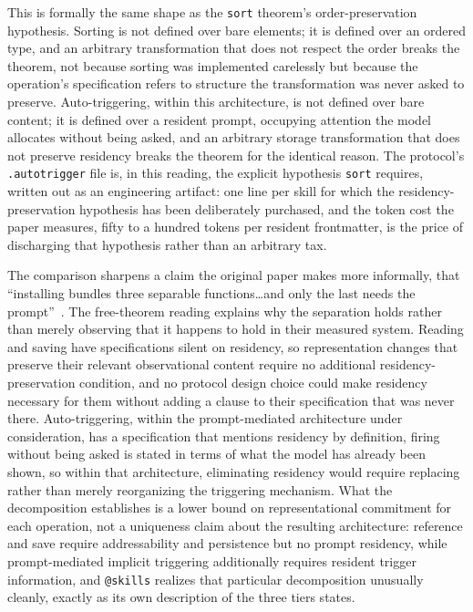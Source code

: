 \documentclass[11pt]{article}
\begin{document}
This is formally the same shape as the \texttt{sort} theorem's order-preservation hypothesis. Sorting is not defined over bare elements; it is defined over an ordered type, and an arbitrary transformation that does not respect the order breaks the theorem, not because sorting was implemented carelessly but because the operation's specification refers to structure the transformation was never asked to preserve. Auto-triggering, within this architecture, is not defined over bare content; it is defined over a resident prompt, occupying attention the model allocates without being asked, and an arbitrary storage transformation that does not preserve residency breaks the theorem for the identical reason. The protocol's \texttt{.autotrigger} file is, in this reading, the explicit hypothesis \texttt{sort} requires, written out as an engineering artifact: one line per skill for which the residency-preservation hypothesis has been deliberately purchased, and the token cost the paper measures, fifty to a hundred tokens per resident frontmatter, is the price of discharging that hypothesis rather than an arbitrary tax.

The comparison sharpens a claim the original paper makes more informally, that ``installing bundles three separable functions\ldots and only the last needs the prompt''~\cite{skills2026}. The free-theorem reading explains why the separation holds rather than merely observing that it happens to hold in their measured system. Reading and saving have specifications silent on residency, so representation changes that preserve their relevant observational content require no additional residency-preservation condition, and no protocol design choice could make residency necessary for them without adding a clause to their specification that was never there. Auto-triggering, within the prompt-mediated architecture under consideration, has a specification that mentions residency by definition, firing without being asked is stated in terms of what the model has already been shown, so within that architecture, eliminating residency would require replacing rather than merely reorganizing the triggering mechanism. What the decomposition establishes is a lower bound on representational commitment for each operation, not a uniqueness claim about the resulting architecture: reference and save require addressability and persistence but no prompt residency, while prompt-mediated implicit triggering additionally requires resident trigger information, and \texttt{@skills} realizes that particular decomposition unusually cleanly, exactly as its own description of the three tiers states.
\end{document}
